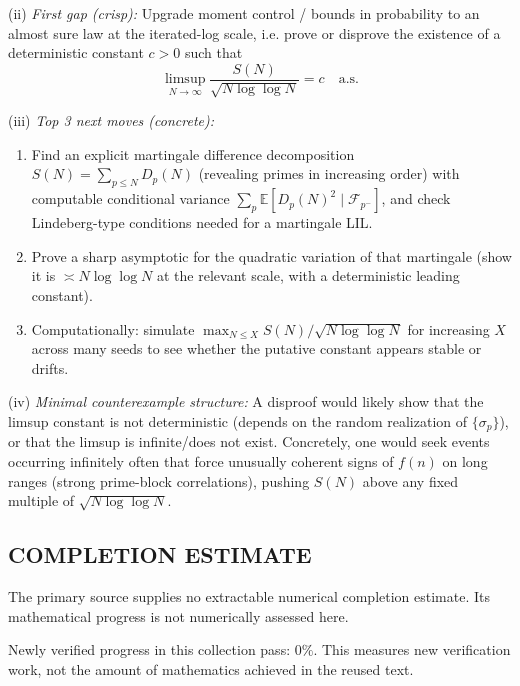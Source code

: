(ii) \emph{First gap (crisp):}
Upgrade moment control / bounds in probability to an almost sure law at the iterated-log scale, i.e. prove or disprove the existence of a deterministic constant $c>0$ such that
\[\limsup_{N\to\infty}\frac{S(N)}{\sqrt{N\log\log N}}=c\quad\text{a.s.}\]

(iii) \emph{Top 3 next moves (concrete):}
\begin{enumerate}
\item Find an explicit martingale difference decomposition $S(N)=\sum_{p\le N} D_p(N)$ (revealing primes in increasing order) with computable conditional variance $\sum_p \mathbb E[D_p(N)^2\mid \mathcal F_{p^-}]$, and check Lindeberg-type conditions needed for a martingale LIL.
\item Prove a sharp asymptotic for the quadratic variation of that martingale (show it is $\asymp N\log\log N$ at the relevant scale, with a deterministic leading constant).
\item Computationally: simulate $\max_{N\le X} S(N)/\sqrt{N\log\log N}$ for increasing $X$ across many seeds to see whether the putative constant appears stable or drifts.
\end{enumerate}

(iv) \emph{Minimal counterexample structure:}
A disproof would likely show that the limsup constant is not deterministic (depends on the random realization of $\{\sigma_p\}$), or that the limsup is infinite/does not exist. Concretely, one would seek events occurring infinitely often that force unusually coherent signs of $f(n)$ on long ranges (strong prime-block correlations), pushing $S(N)$ above any fixed multiple of $\sqrt{N\log\log N}$.




\subsection*{COMPLETION ESTIMATE}
The primary source supplies no extractable numerical completion estimate. Its mathematical progress is not numerically assessed here.

Newly verified progress in this collection pass: $0\%$. This measures new verification work, not the amount of mathematics achieved in the reused text.
